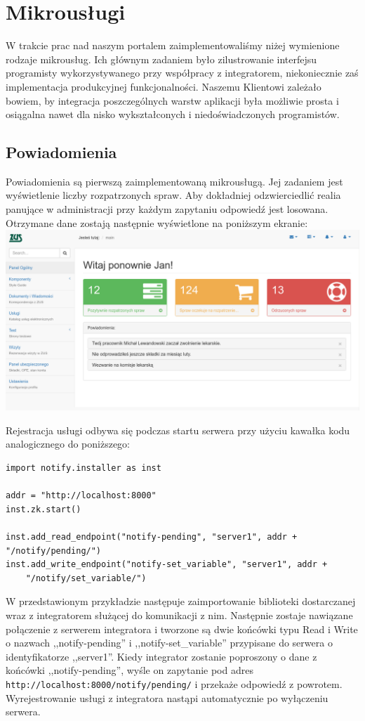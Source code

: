 \documentclass[licencjacka]{pracamgr}
\begin{document}
\section{Mikrousługi}

W trakcie prac nad naszym portalem zaimplementowaliśmy niżej wymienione rodzaje
mikrousług. Ich głównym zadaniem było zilustrowanie interfejsu programisty
wykorzystywanego przy współpracy z integratorem, niekoniecznie zaś implementacja
produkcyjnej funkcjonalności. Naszemu Klientowi zależało bowiem, by integracja
poszczególnych warstw aplikacji była możliwie prosta i osiągalna nawet dla nisko
wykształconych i niedoświadczonych programistów.

\subsection{Powiadomienia}

Powiadomienia są pierwszą zaimplementowaną mikrousługą. Jej zadaniem jest wyświetlenie
liczby rozpatrzonych spraw. Aby dokładniej odzwierciedlić realia panujące w
administracji przy każdym zapytaniu odpowiedź jest losowana. Otrzymane dane
zostają następnie wyświetlone na poniższym ekranie:\\
\includegraphics[width=\textwidth]{obrazki/powiadomienia2.png}

Rejestracja usługi odbywa się podczas startu serwera przy użyciu kawałka kodu
analogicznego do poniższego:

\begin{verbatim}
import notify.installer as inst

addr = "http://localhost:8000"
inst.zk.start()

inst.add_read_endpoint("notify-pending", "server1", addr + "/notify/pending/")
inst.add_write_endpoint("notify-set_variable", "server1", addr +
	"/notify/set_variable/")
\end{verbatim}
W przedstawionym przykładzie następuje zaimportowanie biblioteki dostarczanej wraz z
integratorem służącej do komunikacji z nim. Następnie zostaje nawiązane połączenie z
serwerem integratora i tworzone są dwie końcówki typu Read i Write o nazwach
,,notify-pending'' i ,,notify-set\_variable'' przypisane do serwera o identyfikatorze
,,server1''. Kiedy integrator zostanie poproszony o dane z końcówki ,,notify-pending'',
wyśle on zapytanie pod adres \texttt{http://localhost:8000/notify/pending/} i przekaże
odpowiedź z powrotem. Wyrejestrowanie usługi z integratora nastąpi automatycznie po
wyłączeniu serwera.
\end{document}
